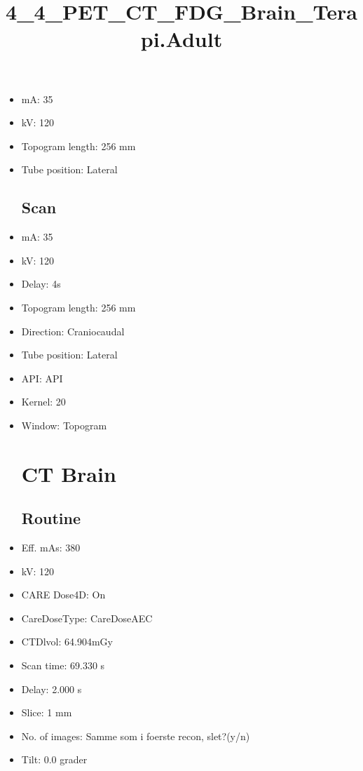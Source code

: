 \documentclass[12pt]{article}
\title{4\_4\_PET\_CT\_FDG\_Brain\_Terapi.Adult}
\begin{document}
\maketitle
\newpage
\tableofcontents
\newpage
{}


\begin{itemize}\section{Topogram}
\subsection{Routine}
\item mA: 35\item kV: 120\item Topogram length: 256 mm\item Tube position: Lateral
\subsection{Scan}\item mA: 35\item kV: 120\item Delay: 4s\item Topogram length: 256 mm\item Direction: Craniocaudal\item Tube position: Lateral\item API: API \item Kernel: 20\item Window: Topogram
\section{CT Brain}
\subsection{Routine}
\item Eff. mAs: 380\item kV: 120\item CARE Dose4D: On\item CareDoseType: CareDoseAEC\item CTDlvol: 64.904mGy\item Scan time: 69.330 s\item Delay: 2.000 s\item Slice: 1 mm\item No. of images: Samme som i foerste recon, slet?(y/n)\item Tilt: 0.0 grader

\end{itemize}
\end{document}
